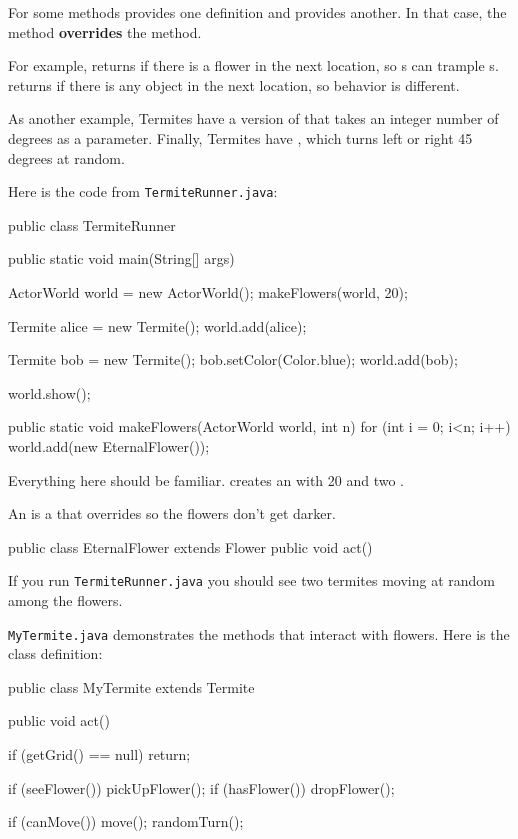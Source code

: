 For some methods  provides one definition and  provides another.
In that case, the  method {\bf overrides} the  method.

For example,  returns  if there is a flower in the next location, so s can trample s.
 returns  if there is any object in the next location, so  behavior is different.

As another example, Termites have a version of  that takes an integer number of degrees as a parameter.
Finally, Termites have , which turns left or right 45 degrees at random.

Here is the code from {\tt TermiteRunner.java}:

\begin{code}
public class TermiteRunner
{
    public static void main(String[] args)
    {
        ActorWorld world = new ActorWorld();
        makeFlowers(world, 20);

        Termite alice = new Termite();
        world.add(alice);

        Termite bob = new Termite();
        bob.setColor(Color.blue);
        world.add(bob);

        world.show();
    }

    public static void makeFlowers(ActorWorld world, int n) {
        for (int i = 0; i<n; i++) {
            world.add(new EternalFlower());
        }
    }
}
\end{code}

Everything here should be familiar.
 creates an  with 20  and two .

An  is a  that overrides  so the flowers don't get darker.

\begin{code}
public class EternalFlower extends Flower {
    public void act() {}
}
\end{code}

If you run {\tt TermiteRunner.java} you should see two termites moving at random among the flowers.

{\tt MyTermite.java} demonstrates the methods that interact with flowers.
Here is the class definition:

\begin{code}
public class MyTermite extends Termite {

    public void act() {
        if (getGrid() == null)
            return;

        if (seeFlower()) {
            pickUpFlower();
        }
        if (hasFlower()) {
            dropFlower();
        }

        if (canMove()) {
            move();
        }
        randomTurn();
    }
}
\end{code}


